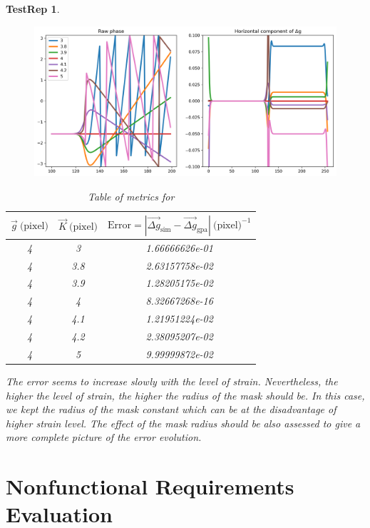 \documentclass[12pt, titlepage]{article}
\newtheorem{TestRep}{TestRep}
\begin{document}
\begin{TestRep}
\begin{figure}[H]
\begin{center}
\includegraphics[scale=0.5]{Figures/Test_3_test_results.png}
\caption{}
\label{fig:Test_3_test_results}
\end{center}
\end{figure}

\begin{table}[H]
\centering
\begin{tabular}{|c|c|c|}
\hline
$\overrightarrow{g} \ \text{(pixel)}$ & $\overrightarrow{K} \ \text{(pixel)}$ & $\text{Error}=|\overrightarrow{\Delta g}_{\text{sim}}-\overrightarrow{\Delta g}_{\text{gpa}}| \ \text{(pixel)}^{-1}$ \\
\hline
4 & 3 & 1.66666626e-01 \\ \hline
4 & 3.8 & 2.63157758e-02 \\ \hline
4 & 3.9 & 1.28205175e-02 \\ \hline
4 & 4 & 8.32667268e-16 \\ \hline
4 & 4.1 & 1.21951224e-02 \\ \hline
4 & 4.2 & 2.38095207e-02 \\ \hline
4 & 5 & 9.99999872e-02 \\ \hline
\end{tabular}
\caption{Table of metrics for}\label{tb:Metric_test_3_multi_case}
\end{table}

The error seems to increase slowly with the level of strain. Nevertheless, the higher the level of strain, the higher the radius of the mask should be. In this case, we kept the radius of the mask constant which can be at the disadvantage of higher strain level. The effect of the mask radius should be also assessed to give a more complete picture of the error evolution.
\end{TestRep}

\section{Nonfunctional Requirements Evaluation}
\end{document}
